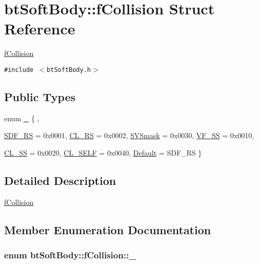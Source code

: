 \hypertarget{structbt_soft_body_1_1f_collision}{
\section{btSoftBody::fCollision Struct Reference}
\label{structbt_soft_body_1_1f_collision}
}
\hyperlink{structbt_soft_body_1_1f_collision}{fCollision}  


{\tt \#include $<$btSoftBody.h$>$}

\subsection*{Public Types}
\begin{CompactItemize}
\item 
enum \hyperlink{structbt_soft_body_1_1f_collision_feb40bef0380b8db7e9e5628cc5f08d5}{\_\-} \{ , \par
\hyperlink{structbt_soft_body_1_1f_collision_feb40bef0380b8db7e9e5628cc5f08d57c057a9cdfcd280d9ec3bf69e09edc62}{SDF\_\-RS} =  0x0001, 
\hyperlink{structbt_soft_body_1_1f_collision_feb40bef0380b8db7e9e5628cc5f08d5f9bbf62b0d36af93b1198eb19d800813}{CL\_\-RS} =  0x0002, 
\hyperlink{structbt_soft_body_1_1f_collision_feb40bef0380b8db7e9e5628cc5f08d5720d2ba3f15fb6ca5c417c5971eb05b6}{SVSmask} =  0x0030, 
\hyperlink{structbt_soft_body_1_1f_collision_feb40bef0380b8db7e9e5628cc5f08d51ad696f1fa631c1256c18a3c8eb18ebc}{VF\_\-SS} =  0x0010, 
\par
\hyperlink{structbt_soft_body_1_1f_collision_feb40bef0380b8db7e9e5628cc5f08d5602caf1ca49fea4d9215dbea6ad17f04}{CL\_\-SS} =  0x0020, 
\hyperlink{structbt_soft_body_1_1f_collision_feb40bef0380b8db7e9e5628cc5f08d571505ee64a4a976707c73ec67cfcd533}{CL\_\-SELF} =  0x0040, 
\hyperlink{structbt_soft_body_1_1f_collision_feb40bef0380b8db7e9e5628cc5f08d51c6fb7a4f36642982c053815889133e5}{Default} =  SDF\_\-RS
 \}
\end{CompactItemize}


\subsection{Detailed Description}
\hyperlink{structbt_soft_body_1_1f_collision}{fCollision} 

\subsection{Member Enumeration Documentation}
\hypertarget{structbt_soft_body_1_1f_collision_feb40bef0380b8db7e9e5628cc5f08d5}{
\subsubsection[\_\-]{\setlength{\rightskip}{0pt plus 5cm}enum {\bf btSoftBody::fCollision::\_\-}}}
\label{structbt_soft_body_1_1f_collision_feb40bef0380b8db7e9e5628cc5f08d5}


